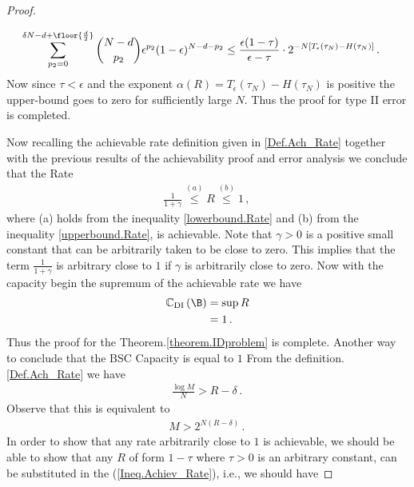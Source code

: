 \begin{proof}
\begin{itemize}
\begin{enumerate}
\begin{align}
 \sum_{p_2=0}^{\delta N -d+\floor{\frac{d}{2}}} \binom{N-d}{p_2}\epsilon^{p_2}  (1-\epsilon)^{N-d-p_2} &\leq \frac{\epsilon(1-\tau)}{\epsilon-\tau}\cdot 2^{-N\left[T_{\epsilon}(\tau_N) - H(\tau_N)\right]}\,.\,
\end{align}
%
Now since $\tau < \epsilon$ and the exponent $\alpha(R) = T_{\epsilon}(\tau_N) - H(\tau_N)$ is positive the upper-bound goes to zero for sufficiently large $N$. Thus the proof for type II error is completed.
    \end{enumerate}
\end{itemize}
Now recalling the achievable rate definition given in \ref{Def.Ach_Rate} together with the previous results of the achievability proof and error analysis we conclude that the Rate
\begin{align}
  \frac{1}{1+\gamma}\stackrel{(a)}{\leq} R \stackrel{(b)}{\leq} 1  \,,\,
\end{align}
where (a) holds from the inequality \eqref{lowerbound.Rate} and (b) from the inequality \eqref{upperbound.Rate}, is achievable. Note that $\gamma>0$ is a positive small constant that can be arbitrarily taken to be close to zero. This implies that the term $\frac{1}{1+\gamma}$ is arbitrary close to $1$ if $\gamma$ is arbitrarily close to zero. \newline
Now with the capacity begin the supremum of the achievable rate we have 
\begin{align}
 \mathbb{C}_{\text{DI}}\left( \B \right) &= \sup R \\
 & = 1 \,.\,
\end{align}
Thus the proof for the Theorem.\ref{theorem.IDproblem} is complete.\newline
%
Another way to conclude that the BSC Capacity is equal to $1$ From the definition.\ref{Def.Ach_Rate} we have 
\begin{align}
    \label{Ineq.Achiev_Rate}
    \frac{\log{M}}{N} > R - \delta  \,.\,
\end{align}
Observe that this is equivalent to
\begin{align}
    M > 2^{N(R-\delta)} \,.\,
\end{align}
In order to show that any rate arbitrarily close to $1$ is achievable, we should be able to
show that any $R$ of form $1-\tau$ where $\tau > 0$ is an arbitrary constant, can be substituted in the (\ref{Ineq.Achiev_Rate}), i.e., we should have

\end{proof}
